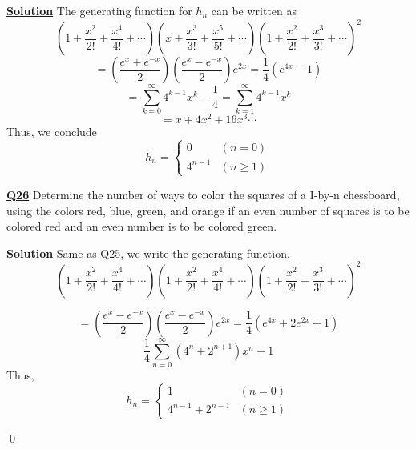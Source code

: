 \documentclass{article}
\newcommand{\new}[1]{
    \vspace{2mm}
    \noindent
    \textbf{
    \underline{#1}}
}
\begin{document}
\new{Solution} The generating function for $h_n$ can be written as 
\[
    \left(
        1 + \frac {x^2} {2!} + \frac {x^4} {4!} + \cdots
    \right)
\left(
        x + \frac {x^3} {3!} + \frac {x^5} {5!} + \cdots
    \right)
     \left(
        1 + \frac {x^2} {2!} + \frac {x^3} {3!} + \cdots
    \right)^2
\]
\[
    = \left(
        \frac {e^x + e^{-x}} 2
    \right)
\left(
        \frac {e^x - e^{-x}} 2
    \right)
    e^{2x}
    = 
    \frac 1 4 (e^{4x} - 1)
\]
\[
    = 
    \sum_{k = 0} ^ \infty 
    4^{k - 1} x^{k}
     - \frac 1 4
     =
     \sum_{k = 1} ^ \infty 
     4^{k - 1} x^k
\]
\[
   = x + 4x^2 + 16 x^3 \cdots 
\]
Thus, we conclude 
\[
    h_n = 
    \begin{cases} 
        0 & (n = 0)
        \\
        4^{n - 1} & (n \geq 1)
    \end{cases}
\]

\new{Q26} Determine the number of ways to color the squares of a I-by-n chessboard, 
using the colors red, blue, green, and orange if an even number of squares is to 
be colored red and an even number is to be colored green. 

\new{Solution} Same as Q25, we write the generating function. 
\[
    \left(
        1 + \frac {x^2} {2!} + \frac {x^4} {4!} + \cdots
    \right)
\left(
        1 + \frac {x^2} {2!} + \frac {x^4} {4!} + \cdots
    \right)
     \left(
        1 + \frac {x^2} {2!} + \frac {x^3} {3!} + \cdots
    \right)^2
\]

\[
    = \left(
        \frac {e^x - e^{-x}} 2
    \right)
\left(
        \frac {e^x - e^{-x}} 2
    \right)
    e^{2x}
    = 
    \frac 1 4 (e^{4x} + 2e^{2x} +1)
\]
\[
    \frac 1 4 
    \sum_{n = 0}^\infty 
    \left(
        4^n + 2^{n+1}
    \right)x^n
    +1
\]
Thus, \[
 h_n = 
 \begin{cases}
    1 &(n = 0)\\
    4^{n - 1} + 2^{n - 1} & ( n \geq 1)
 \end{cases}
\]

\hfill \qed
\end{document}
